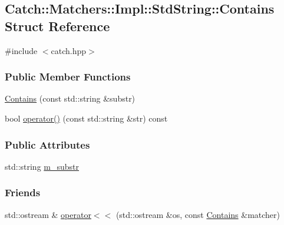 \hypertarget{structCatch_1_1Matchers_1_1Impl_1_1StdString_1_1Contains}{\subsection{Catch\-:\-:Matchers\-:\-:Impl\-:\-:Std\-String\-:\-:Contains Struct Reference}
\label{structCatch_1_1Matchers_1_1Impl_1_1StdString_1_1Contains}
}


{\ttfamily \#include $<$catch.\-hpp$>$}

\subsubsection*{Public Member Functions}
\begin{DoxyCompactItemize}
\item 
\hyperlink{structCatch_1_1Matchers_1_1Impl_1_1StdString_1_1Contains_a329b03ab3a18970ed0612f4387a554a4}{Contains} (const std\-::string \&substr)
\item 
bool \hyperlink{structCatch_1_1Matchers_1_1Impl_1_1StdString_1_1Contains_a00b2607249ca28c81a1aced2a5c77b8f}{operator()} (const std\-::string \&str) const 
\end{DoxyCompactItemize}
\subsubsection*{Public Attributes}
\begin{DoxyCompactItemize}
\item 
std\-::string \hyperlink{structCatch_1_1Matchers_1_1Impl_1_1StdString_1_1Contains_a0bad82dd7cbdd0ec06b6d562181db03e}{m\-\_\-substr}
\end{DoxyCompactItemize}
\subsubsection*{Friends}
\begin{DoxyCompactItemize}
\item 
std\-::ostream \& \hyperlink{structCatch_1_1Matchers_1_1Impl_1_1StdString_1_1Contains_a8df8dcad0e24173b72cb72dcd0d1d1e0}{operator$<$$<$} (std\-::ostream \&os, const \hyperlink{structCatch_1_1Matchers_1_1Impl_1_1StdString_1_1Contains}{Contains} \&matcher)
\end{DoxyCompactItemize}


